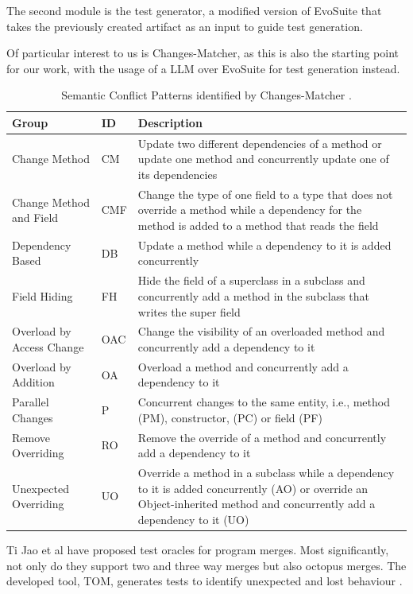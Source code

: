 The second module is the test generator, a modified version of EvoSuite that takes the previously created artifact as an input to guide test generation.

Of particular interest to us is Changes-Matcher, as this is also the starting point for our work, with the usage of a LLM over EvoSuite for test generation instead.

\begin{table}[!h]
\setlength\extrarowheight{2pt}
\begin{tabularx}{\textwidth}{|l|l|X|}
 \hline
 Group & ID & Description \\ [0.5ex] 
 \hline\hline
 Change Method  & CM & Update two different dependencies of a method or update one method and concurrently update one of its
dependencies \\ 
 \hline
 Change Method
and Field & CMF & Change the type of one field to a type that does not
override a method while a dependency for the method
is added to a method that reads the field
 \\
 \hline
 Dependency
Based & DB & Update a method while a dependency to it is added
concurrently \\
 \hline
 Field Hiding & FH & Hide the field of a superclass in a subclass and concurrently add a method in the subclass that writes the
super field
 \\
 \hline
 Overload by Access Change & OAC & Change the visibility of an overloaded method and
concurrently add a dependency to it \\ 
 \hline
 Overload by Addition & OA & Overload a method and concurrently add a dependency to it \\  
 \hline
 Parallel Changes & P & Concurrent changes to the same entity, i.e., method
(PM), constructor, (PC) or field (PF) \\ 
 \hline
 Remove Overriding & RO & Remove the override of a method and concurrently
add a dependency to it \\  
  \hline
 Unexpected Overriding & UO & Override a method in a subclass while a dependency to it is added concurrently (AO) or override an
Object-inherited method and concurrently add a dependency to it (UO) \\ [1ex] 
 \hline
\end{tabularx}
\caption{\label{table:pattern-table}Semantic Conflict Patterns identified by Changes-Matcher \citep{kn:nuno}.}
\end{table}


Ti Jao et al have proposed test oracles for program merges. Most significantly, not only do they support two and three way merges but also octopus merges. The developed tool, TOM, generates tests to identify unexpected and lost behaviour \citep{kn:ji2022}.

